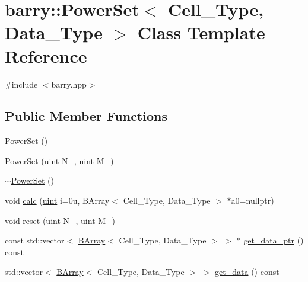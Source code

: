 \hypertarget{classbarry_1_1_power_set}{}\section{barry\+:\+:Power\+Set$<$ Cell\+\_\+\+Type, Data\+\_\+\+Type $>$ Class Template Reference}
\label{classbarry_1_1_power_set}


{\ttfamily \#include $<$barry.\+hpp$>$}

\subsection*{Public Member Functions}
\begin{DoxyCompactItemize}
\item 
\hyperlink{classbarry_1_1_power_set_ad9e3904c7f7052d724603bc28acd18d1}{Power\+Set} ()
\item 
\hyperlink{classbarry_1_1_power_set_a730140941912ef1b3ae1b5b85437268c}{Power\+Set} (\hyperlink{namespacebarry_a11dfc53ddb4672278319aa04f1e09a6c}{uint} N\+\_\+, \hyperlink{namespacebarry_a11dfc53ddb4672278319aa04f1e09a6c}{uint} M\+\_\+)
\item 
\hyperlink{classbarry_1_1_power_set_a0fc9f4aeb2c780033f5909170f215c99}{$\sim$\+Power\+Set} ()
\item 
void \hyperlink{classbarry_1_1_power_set_a93e31ba8891642db6ecf0fca82c71f6a}{calc} (\hyperlink{namespacebarry_a11dfc53ddb4672278319aa04f1e09a6c}{uint} i=0u, B\+Array$<$ Cell\+\_\+\+Type, Data\+\_\+\+Type $>$ $\ast$a0=nullptr)
\item 
void \hyperlink{classbarry_1_1_power_set_a8074f5a6d44b6b7f6bad56d15576eb9f}{reset} (\hyperlink{namespacebarry_a11dfc53ddb4672278319aa04f1e09a6c}{uint} N\+\_\+, \hyperlink{namespacebarry_a11dfc53ddb4672278319aa04f1e09a6c}{uint} M\+\_\+)
\item 
const std\+::vector$<$ \hyperlink{classbarry_1_1_b_array}{B\+Array}$<$ Cell\+\_\+\+Type, Data\+\_\+\+Type $>$ $>$ $\ast$ \hyperlink{classbarry_1_1_power_set_ab909404d85f177a3cd0b8cca1eaf4efd}{get\+\_\+data\+\_\+ptr} () const
\item 
std\+::vector$<$ \hyperlink{classbarry_1_1_b_array}{B\+Array}$<$ Cell\+\_\+\+Type, Data\+\_\+\+Type $>$ $>$ \hyperlink{classbarry_1_1_power_set_a273dae1795f3d663ef031c50bd218788}{get\+\_\+data} () const
\end{DoxyCompactItemize}

